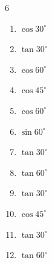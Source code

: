 \begin{multicols}{6}
\begin{enumerate}
  \item $\displaystyle \cos{30^\circ}$


  \item $\displaystyle \tan{30^\circ}$


  \item $\displaystyle \cos{60^\circ}$


  \item $\displaystyle \cos{45^\circ}$


\columnbreak %

  \item $\displaystyle \cos{60^\circ}$


  \item $\displaystyle \sin{60^\circ}$


  \item $\displaystyle \tan{30^\circ}$


  \item $\displaystyle \tan{60^\circ}$


  \item $\displaystyle \tan{30^\circ}$


  \item $\displaystyle \cos{45^\circ}$


  \item $\displaystyle \tan{30^\circ}$


  \item $\displaystyle \tan{60^\circ}$



\end{enumerate}
\end{multicols}
